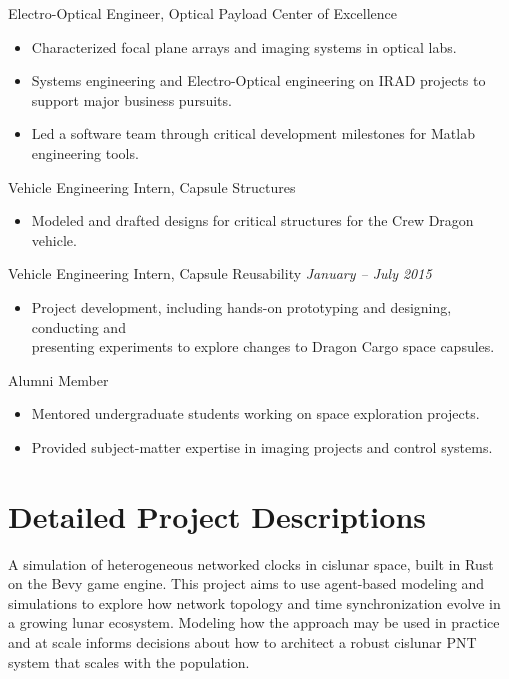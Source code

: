 \documentclass[10pt,final,sans]{resume}
\begin{document}
Electro-Optical Engineer, Optical Payload Center of Excellence
\begin{itemize}
  \item Characterized focal plane arrays and imaging systems in optical labs.
  \item Systems engineering and Electro-Optical engineering on IRAD projects to
  support major business pursuits.
  \item Led a software team through critical development milestones for Matlab
  engineering tools.
\end{itemize}
Vehicle Engineering Intern, Capsule Structures
\begin{itemize}
  \item Modeled and drafted designs for critical structures for the Crew Dragon
  vehicle.
\end{itemize}

Vehicle Engineering Intern, Capsule Reusability \hfill {\it January -- July 2015}
\begin{itemize}
  \item Project development, including hands-on prototyping and designing,
  conducting and \\
  presenting experiments to explore changes to Dragon Cargo space capsules.
\end{itemize}

Alumni Member
\begin{itemize}
  \item Mentored undergraduate students working on space exploration projects.
  \item Provided subject-matter expertise in imaging projects and control systems.
\end{itemize}

\break
\section{Detailed Project Descriptions}
A simulation of heterogeneous networked clocks in cislunar space, built in Rust on the Bevy game engine. This project aims to use agent-based modeling and simulations to explore how network topology and time synchronization evolve in a growing lunar ecosystem. Modeling how the approach may be used in practice and at scale informs decisions about how to architect a robust cislunar PNT system that scales with the population.
\end{document}
